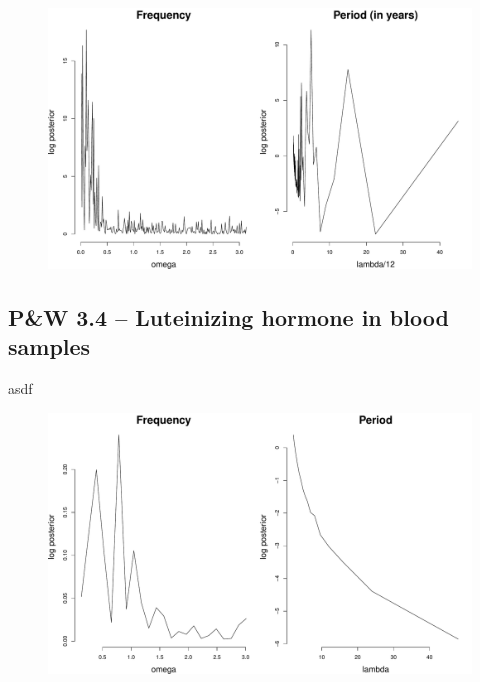 \documentclass[12pt]{article}
\begin{document}
\begin{figure}[H]
\begin{center}
\includegraphics[scale=0.40]{fp_soi.pdf}
\end{center}
\end{figure}

\subsection*{P\&W 3.4 -- Luteinizing hormone in blood samples}

asdf

\begin{figure}[H]
\begin{center}
\includegraphics[scale=0.40]{fp_lh.pdf}
\end{center}
\end{figure}
\end{document}
